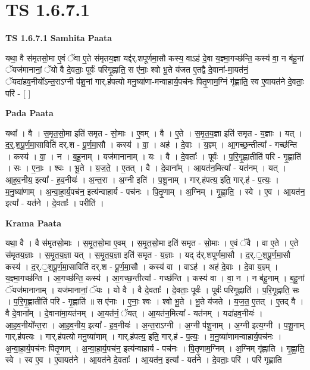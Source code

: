 \documentclass[17pt]{extarticle}
\begin{document}
\section{ TS 1.6.7.1 }

\textbf{TS 1.6.7.1 } \newline
\textbf{Samhita Paata} \newline

यथा॒ वै स॑मृतसो॒मा ए॒वं ॅवा ए॒ते स॑मृतय॒ज्ञा यद्द॑र्.शपूर्णमा॒सौ कस्य॒ वाऽह॑ दे॒वा य॒ज्ञ्मा॒गच्छ॑न्ति॒ कस्य॑ वा॒ न ब॑हू॒नां ॅयज॑मानानां॒ ॅयो वै दे॒वताः॒ पूर्वः॑ परिगृ॒ह्णाति॒ स ए॑नाः॒ श्वो भू॒ते य॑जत ए॒तद्वै दे॒वाना॑-मा॒यत॑नं॒ ॅयदा॑हव॒नीयो᳚ऽन्त॒राऽग्नी प॑शू॒नां गार्.ह॑पत्यो मनु॒ष्या॑णा-मन्वाहार्य॒पच॑नः पितृ॒णाम॒ग्निं गृ॑ह्णाति॒ स्व ए॒वायत॑ने दे॒वताः॒ परि॑ - [ ] \newline

\textbf{Pada Paata} \newline

यथा᳚ । वै । स॒मृ॒त॒सो॒मा इति॑ समृत - सो॒माः । ए॒वम् । वै । ए॒ते । स॒मृ॒त॒य॒ज्ञा इति॑ समृत - य॒ज्ञाः । यत् । द॒र्॒.श॒पू॒र्ण॒मा॒साविति॑ दर्.श - पू॒र्ण॒मा॒सौ । कस्य॑ । वा॒ । अह॑ । दे॒वाः । य॒ज्ञ्म् । आ॒गच्छ॒न्तीत्या᳚ - गच्छ॑न्ति । कस्य॑ । वा॒ । न । ब॒हू॒नाम् । यज॑मानानाम् । यः । वै । दे॒वताः᳚ । पूर्वः॑ । प॒रि॒गृ॒ह्णातीति॑ परि - गृ॒ह्णाति॑ । सः । ए॒नाः॒ । श्वः । भू॒ते । य॒ज॒ते॒ । ए॒तत् । वै । दे॒वाना᳚म् । आ॒यत॑न॒मित्या᳚ - यत॑नम् । यत् । आ॒ह॒व॒नीय॒ इत्या᳚ - ह॒व॒नीयः॑ । अ॒न्त॒रा । अ॒ग्नी इति॑ । प॒शू॒नाम् । गार्.ह॑पत्य॒ इति॒ गार्.ह॑ - प॒त्यः॒ । म॒नु॒ष्या॑णाम् । अ॒न्वा॒हा॒र्य॒पच॑न॒ इत्य॑न्वाहार्य - पच॑नः । पि॒तृ॒णाम् । अ॒ग्निम् । गृ॒ह्णा॒ति॒ । स्वे । ए॒व । आ॒यत॑न॒ इत्या᳚ - यत॑ने । दे॒वताः᳚ । परीति॑ ।  \newline


\textbf{Krama Paata} \newline

यथा॒ वै । वै स॑मृतसो॒माः । स॒मृ॒त॒सो॒मा ए॒वम् । स॒मृ॒त॒सो॒मा इति॑ समृत - सो॒माः । ए॒वं ॅवै । वा ए॒ते । ए॒ते स॑मृतय॒ज्ञाः । स॒मृ॒त॒य॒ज्ञा यत् । स॒मृ॒त॒य॒ज्ञा इति॑ समृत - य॒ज्ञाः । यद् द॑र्.शपूर्णमा॒सौ । द॒र्.॒श॒पू॒र्ण॒मा॒सौ कस्य॑ । द॒र्.॒श॒पू॒र्ण॒मा॒साविति॑ दर्.श - पू॒र्ण॒मा॒सौ । कस्य॑ वा । वाऽह॑ । अह॑ दे॒वाः । दे॒वा य॒ज्ञ्म् । य॒ज्ञ्मा॒गच्छ॑न्ति । आ॒गच्छ॑न्ति॒ कस्य॑ । आ॒गच्छ॒न्तीत्या᳚ - गच्छ॑न्ति । कस्य॑ वा । वा॒ न । न ब॑हू॒नाम् । ब॒हू॒नां ॅयज॑मानानाम् । यज॑मानानां॒ ॅयः । यो वै । वै दे॒वताः᳚ । दे॒वताः॒ पूर्वः॑ । पूर्वः॑ परिगृ॒ह्णाति॑ । प॒रि॒गृ॒ह्णाति॒ सः । प॒रि॒गृ॒ह्णातीति॑ परि - गृ॒ह्णाति॑ ॥ स ए॑नाः । ए॒नाः॒ श्वः । श्वो भू॒ते । भू॒ते य॑जते । य॒ज॒त॒ ए॒तत् । ए॒तद् वै । वै दे॒वाना᳚म् । दे॒वाना॑मा॒यत॑नम् । आ॒यत॑नं॒ ॅयत् । आ॒यत॑न॒मित्या᳚ - यत॑नम् । यदा॑हव॒नीयः॑ । आ॒ह॒व॒नीयो᳚न्त॒रा । आ॒ह॒व॒नीय॒ इत्या᳚ - ह॒व॒नीयः॑ । अ॒न्त॒राऽग्नी । अ॒ग्नी प॑शू॒नाम् । अ॒ग्नी इत्य॒ग्नी । प॒शू॒नाम् गार्.ह॑पत्यः । गार्.ह॑पत्यो मनु॒ष्या॑णाम् । गार्.ह॑पत्य॒ इति॒ गार्.ह॑ - प॒त्यः॒ । म॒नु॒ष्या॑णामन्वाहार्य॒पच॑नः । अ॒न्वा॒हा॒र्य॒पच॑नः पितृ॒णाम् । अ॒न्वा॒हा॒र्य॒पच॑न॒ इत्य॑न्वाहार्य - पच॑नः । पि॒तृ॒णाम॒ग्निम् । अ॒ग्निम् गृ॑ह्णाति । गृ॒ह्णा॒ति॒ स्वे । स्व ए॒व । ए॒वायत॑ने । आ॒यत॑ने दे॒वताः᳚ । आ॒यत॑न॒ इत्या᳚ - यत॑ने । दे॒वताः॒ परि॑ । परि॑ गृह्णाति \newline
\end{document}
